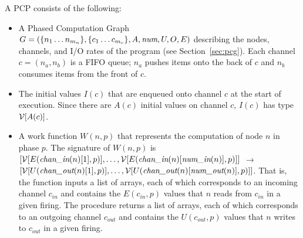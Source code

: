 \noindent A PCP consists of the following:
\begin{itemize}

\item A Phased Computation Graph $G = (\{n_1 \dots n_{m_n}\}, \{c_1
\dots c_{m_c}\}, A, \mbox{\it num}, U, O, E)$ describing the nodes,
channels, and I/O rates of the program (see Section~\ref{sec:pcg}).
Each channel $c = (n_a, n_b)$ is a FIFO queue; $n_a$ pushes items onto
the back of $c$ and $n_b$ consumes items from the front of $c$.

\item The initial values $I(c)$ that are enqueued onto channel $c$ at
the start of execution.  Since there are $A(c)$ initial values on
channel $c$, $I(c)$ has type ${\cal V}[A(c)]$.

%
\item A work function $W(n, p)$ that represents the computation of
node $n$ in phase $p$.  The signature of $W(n, p)$ is $[{\cal
V}[E(\mbox{\it chan\_in}(n)[1], p)], \dots, {\cal
V}[E(\mbox{\it chan\_in}(n)[\mbox{\it num\_in}(n)], p)]]$ $\rightarrow$ \\ $[
{\cal V}[U(\mbox{\it chan\_out}(n)[1], p)], \dots, {\cal
V}[U(\mbox{\it chan\_out}(n)[\mbox{\it num\_out}(n)], p)]]$.  That is, the
function inputs a list of arrays, each of which corresponds to an
incoming channel $c_{in}$ and contains the $E(c_{in},p)$ values that
$n$ reads from $c_{in}$ in a given firing.  The procedure returns a
list of arrays, each of which corresponds to an outgoing channel
$c_{out}$ and contains the $U(c_{out},p)$ values that $n$ writes to
$c_{out}$ in a given firing.

\end{itemize}


